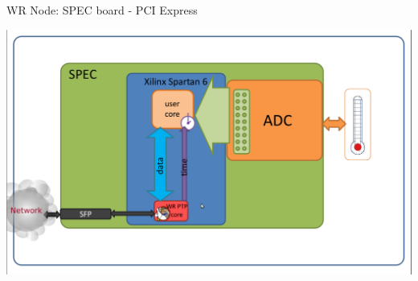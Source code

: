 \documentclass[compress,red]{beamer}
\begin{document}
\begin{frame}{WR Node: SPEC board - PCI Express}

    \begin{center}
    \includegraphics[width=1.0\textwidth]{node/specInterior.pdf}
    \end{center}

\end{frame}
\end{document}
